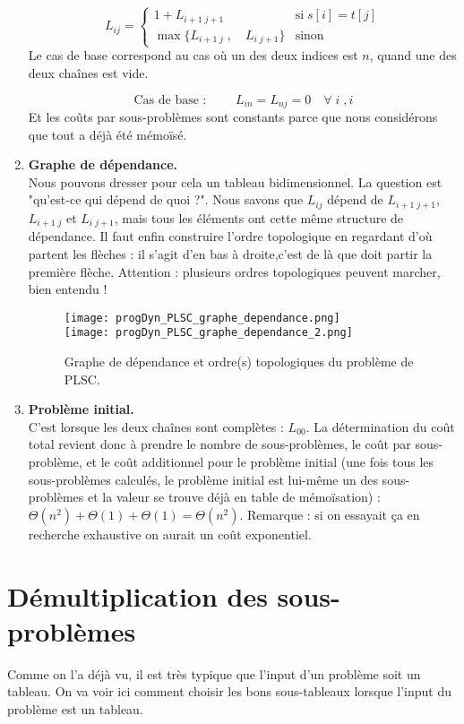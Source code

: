 \documentclass[12pt,a4paper]{book}
\begin{document}
\begin{enumerate}
$$\boxed{L_{ij} = \left\{ \begin{array}{lr}
1+ L_{i+1 \; j+1} & \text{si} \; s[i]=t[j] \\
\max\{L_{i+1 \; j}\; , \quad L_{i \; j+1}\} & \text{sinon}
\end{array}\right. }$$
Le cas de base correspond au cas où un des deux indices est $n$, quand une des deux chaînes est vide. 

$$\boxed{\text{Cas de base : } \qquad L_{in} = L_{nj} = 0 \quad \forall \; i\; , i}$$
Et les coûts par sous-problèmes sont constants parce que nous considérons que tout a déjà été mémoïsé. \\

\item \textbf{Graphe de dépendance.}  \\
Nous pouvons dresser pour cela un tableau bidimensionnel. La question est "qu'est-ce qui dépend de quoi ?". Nous savons que $L_{ij}$ dépend de $L_{i+1\; j+1}$, $L_{i+1 \; j}$ et $L_{i \; j+1}$, mais tous les éléments ont cette même structure de dépendance. Il faut enfin construire l'ordre topologique en regardant d'où partent les flèches : il s'agit d'en bas à droite,c'est de là que doit partir la première flèche. Attention : plusieurs ordres topologiques peuvent marcher, bien entendu ! \\
\begin{figure}
\centering
\texttt{[image: progDyn\_PLSC\_graphe\_dependance.png]} \\
\vspace{1cm}
\texttt{[image: progDyn\_PLSC\_graphe\_dependance\_2.png]}
\caption{Graphe de dépendance et ordre(s) topologiques du problème de PLSC.}
\label{fig:progDyn_PLSC_graphe_dependance}
\end{figure}

\item \textbf{Problème initial.} \\
C'est lorsque les deux chaînes sont complètes : $L_{00}$. La détermination du coût total revient donc à prendre le nombre de sous-problèmes, le coût par sous-problème, et le coût additionnel pour le problème initial (une fois tous les sous-problèmes calculés, le problème initial est lui-même un des sous-problèmes et la valeur se trouve déjà en table de mémoïsation) : $\Theta(n^2) + \Theta(1) + \Theta(1) = \Theta(n^2)$. Remarque : si on essayait ça en recherche exhaustive on aurait un coût exponentiel.
\end{enumerate} 
\section{Démultiplication des sous-problèmes}
Comme on l'a déjà vu, il est très typique que l'input d'un problème soit un tableau. On va voir ici comment choisir les bons sous-tableaux lorsque l'input du problème est un tableau. 
\end{document}
